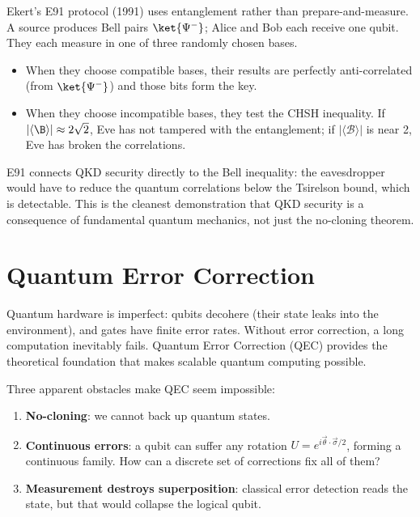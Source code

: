 \documentclass[oneside]{academica}
\begin{document}
Ekert's E91 protocol (1991) uses entanglement rather than prepare-and-measure.
A source produces Bell pairs $\ket{\Psi^-}$; Alice and Bob each receive one qubit.
They each measure in one of three randomly chosen bases.

\begin{itemize}
  \item When they choose compatible bases, their results are perfectly anti-correlated (from $\ket{\Psi^-}$) and those bits form the key.
  \item When they choose incompatible bases, they test the CHSH inequality.
    If $|\langle\B\rangle|\approx2\sqrt{2}$, Eve has not tampered with the entanglement; if $|\langle\mathcal {B}\rangle|$ is near 2, Eve has broken the correlations.
\end{itemize}

E91 connects QKD security directly to the Bell inequality: the eavesdropper would have to reduce the quantum correlations below the Tsirelson bound, which is detectable.
This is the cleanest demonstration that QKD security is a consequence of fundamental quantum mechanics, not just the no-cloning theorem.

\chapter{Quantum Error Correction}\label{chap:qec}

Quantum hardware is imperfect: qubits decohere (their state leaks into the environment), and gates have finite error rates.
Without error correction, a long computation inevitably fails.
Quantum Error Correction (QEC) provides the theoretical foundation that makes scalable quantum computing possible.

Three apparent obstacles make QEC seem impossible:
\begin{enumerate}
  \item \textbf{No-cloning}: we cannot back up quantum states.
  \item \textbf{Continuous errors}: a qubit can suffer any rotation $U=e^{i\vec\theta\cdot\vec\sigma/2}$, forming a continuous family.
    How can a discrete set of corrections fix all of them?
  \item \textbf{Measurement destroys superposition}: classical error detection reads the state, but that would collapse the logical qubit.
\end{enumerate}
\end{document}
